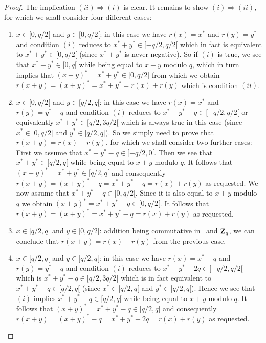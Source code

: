 \documentclass{article}
\newcommand{\zq}{\mbox{${\bf Z}_{q}$}}
\begin{document}
\begin{proof}
  The implication $(ii)\Rightarrow(i)$ is clear. It remains to show 
  $(i)\Rightarrow(ii)$, for which we shall consider four different cases:
  \begin{enumerate}
    \item $x\in[0,q/2[$ and $y\in[0,q/2[$: in this case we have $r(x)=x^{*}$
      and $r(y)=y^{*}$ and condition $(i)$ reduces to $x^{*}+y^{*}\in[-q/2,q/2[$
      which in fact is equivalent to $x^{*}+y^{*}\in[0,q/2[$ (since $x^{*}+y^{*}$
      is never negative). So if $(i)$ is true, we see that $x^{*}+y^{*}\in[0,q[$
      while being equal to $x+y$ modulo $q$, which in turn implies that 
      $(x+y)^{*}=x^{*}+y^{*}\in[0,q/2[$ from which we obtain 
      $r(x+y)=(x+y)^{*}=x^{*}+y^{*}=r(x)+r(y)$ which is condition $(ii)$. 
    \item $x\in[0,q/2[$ and $y\in[q/2,q[$: in this case we have $r(x)=x^{*}$
      and $r(y)=y^{*}-q$ and condition $(i)$ reduces to 
      $x^{*}+y^{*}-q\in[-q/2,q/2[$ or equivalently $x^{*}+y^{*}\in[q/2,3q/2[$
      which is always true in this case (since $x^{*}\in[0,q/2[$ and 
      $y^{*}\in[q/2,q[$). So we simply need to prove that $r(x+y)=r(x)+r(y)$,
      for which we shall consider two further cases: First we assume that
      $x^{*}+y^{*}-q\in[-q/2,0[$. Then we see that $x^{*}+y^{*}\in[q/2,q[$
      while being equal to $x+y$ modulo $q$. It follows that 
      $(x+y)^{*}=x^{*}+y^{*}\in[q/2,q[$ and consequently 
      $r(x+y)= (x+y)^{*}-q=x^{*}+y^{*}-q = r(x)+r(y)$ as requested.
      We now assume that $x^{*}+y^{*}-q\in[0,q/2[$. Since it is also equal
      to $x+y$ modulo $q$ we obtain $(x+y)^{*}=x^{*}+y^{*}-q\in[0,q/2[$.
      It follows that $r(x+y)=(x+y)^{*}=x^{*}+y^{*}-q = r(x)+r(y)$ as 
      requested.
    \item $x\in[q/2,q[$ and $y\in[0,q/2[$: addition being commutative
      in \Z\ and \zq, we can conclude that $r(x+y)=r(x)+r(y)$ from
      the previous case.
    \item $x\in[q/2,q[$ and $y\in[q/2,q[$: in this case we have $r(x)=x^{*}-q$
      and $r(y)=y^{*}-q$ and condition $(i)$ reduces to 
      $x^{*}+y^{*}-2q\in[-q/2,q/2[$ which is $x^{*}+y^{*}-q\in[q/2,3q/2[$
      which is in fact equivalent to $x^{*}+y^{*}-q\in[q/2,q[$ (since 
      $x^{*}\in[q/2,q[$ and $y^{*}\in[q/2,q[$). Hence we see that $(i)$ 
      implies $x^{*}+y^{*}-q\in[q/2,q[$ while being equal to $x+y$ modulo
      $q$. It follows that $(x+y)^{*}=x^{*}+y^{*}-q\in[q/2,q[$ and
      consequently $r(x+y) = (x+y)^{*}-q=x^{*}+y^{*}-2q=r(x)+r(y)$ as 
      requested.
  \end{enumerate}
\end{proof}
\end{document}
